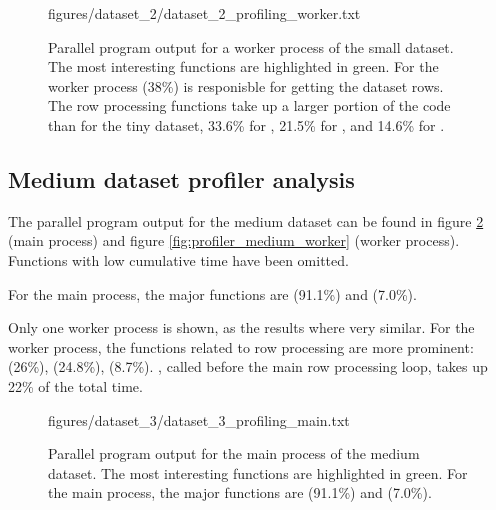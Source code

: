 \begin{figure}[ht]
  \begin{VerbatimInput}{figures/dataset_2/dataset_2_profiling_worker.txt}
    \caption[Parallel program  output for a worker process of the small dataset.]{Parallel program  output for a worker process of the small dataset.
    The most interesting functions are highlighted in green.
  For the worker process  (38\%) is responisble for getting the dataset rows. The row processing functions take up a larger portion of the code
than for the tiny dataset, 33.6\% for , 21.5\% for , and 14.6\% for .}
  \label{fig:profiler_small_worker}
\end{VerbatimInput}
\end{figure}

\subsection{Medium dataset profiler analysis}
The parallel program  output for the medium dataset can be found in figure \ref{fig:profiler_medium_main} (main process) and figure \ref{fig:profiler_medium_worker}
(worker process). Functions with low cumulative time have been omitted.

For the main process, the major functions are  (91.1\%) and  (7.0\%).

Only one worker process is shown, as the results where very similar.
For the worker process, the functions related to row processing are more prominent:  (26\%),  (24.8\%), 
(8.7\%). , called before the main row processing loop, takes up 22\% of the total time.

\begin{figure}[ht]
  \begin{VerbatimInput}{figures/dataset_3/dataset_3_profiling_main.txt}
    \caption[Parallel program  output for the main process of the medium dataset.]{Parallel program  output for the main process of the medium dataset.
    The most interesting functions are highlighted in green.
For the main process, the major functions are  (91.1\%) and  (7.0\%).}
  \label{fig:profiler_medium_main}
\end{VerbatimInput}
\end{figure}

